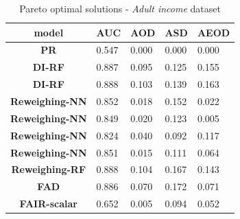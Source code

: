 \documentclass[preprint,12pt]{elsarticle}
\begin{document}
\begin{table}
	\centering
	\caption{Pareto optimal solutions - \textit{Adult income} dataset}
	\begin{tabular}{|c|l|l|l|l|}
		\hline
		\textbf{model}          & \multicolumn{1}{c|}{\textbf{AUC}} & \multicolumn{1}{c|}{\textbf{AOD}} & \multicolumn{1}{c|}{\textbf{ASD}} & \multicolumn{1}{c|}{\textbf{AEOD}} \\ \hline
		\textbf{PR}             & 0.547                             & 0.000                             & 0.000                             & 0.000                              \\ \hline
		\textbf{DI-RF}          & 0.887                             & 0.095                             & 0.125                             & 0.155                              \\ \hline
		\textbf{DI-RF}          & 0.888                             & 0.103                             & 0.139                             & 0.163                              \\ \hline
		\textbf{Reweighing-NN}  & 0.852                             & 0.018                             & 0.152                             & 0.022                              \\ \hline
		\textbf{Reweighing-NN}  & 0.849                             & 0.020                             & 0.123                             & 0.005                              \\ \hline
		\textbf{Reweighing-NN}  & 0.824                             & 0.040                             & 0.092                             & 0.117                              \\ \hline
		\textbf{Reweighing-NN}  & 0.851                             & 0.015                             & 0.111                             & 0.064                              \\ \hline
		\textbf{Reweighing-RF}  & 0.888                             & 0.104                             & 0.167                             & 0.143                              \\ \hline
		\textbf{FAD}            & 0.886                             & 0.070                             & 0.172                             & 0.071                              \\ \hline
		\textbf{FAIR-scalar}    & 0.652                             & 0.005                             & 0.094                             & 0.052                              \\ \hline

\end{tabular}
\end{table}
\end{document}
